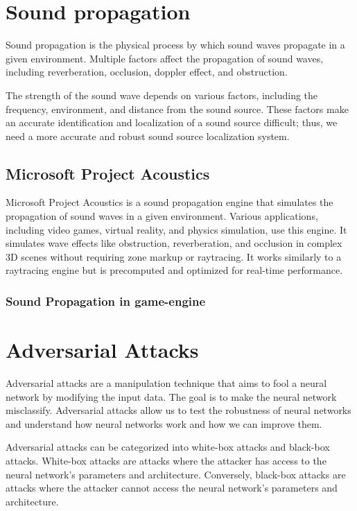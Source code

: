 \section{Sound propagation}
Sound propagation is the physical process by which sound waves propagate in a given environment. Multiple factors affect the propagation of sound waves, including reverberation, occlusion, doppler effect, and obstruction.


The strength of the sound wave depends on various factors, including the frequency, environment, and distance from the sound source. These factors make an accurate identification and localization of a sound source difficult; thus, we need a more accurate and robust sound source localization system.

\subsection{Microsoft Project Acoustics}

Microsoft Project Acoustics is a sound propagation engine that simulates the propagation of sound waves in a given environment. Various applications, including video games, virtual reality, and physics simulation, use this engine. It simulates wave effects like obstruction, reverberation, and occlusion in complex 3D scenes without requiring zone markup or raytracing. It works similarly to a raytracing engine but is precomputed and optimized for real-time performance. 

\subsubsection{Sound Propagation in game-engine}

\section{Adversarial Attacks}
\label{sec:adversarial_attacks}

Adversarial attacks are a manipulation technique that aims to fool a neural network by modifying the input data. The goal is to make the neural network misclassify. Adversarial attacks allow us to test the robustness of neural networks and understand how neural networks work and how we can improve them.

Adversarial attacks can be categorized into white-box attacks and black-box attacks. White-box attacks are attacks where the attacker has access to the neural network's parameters and architecture. Conversely, black-box attacks are attacks where the attacker cannot access the neural network's parameters and architecture.

